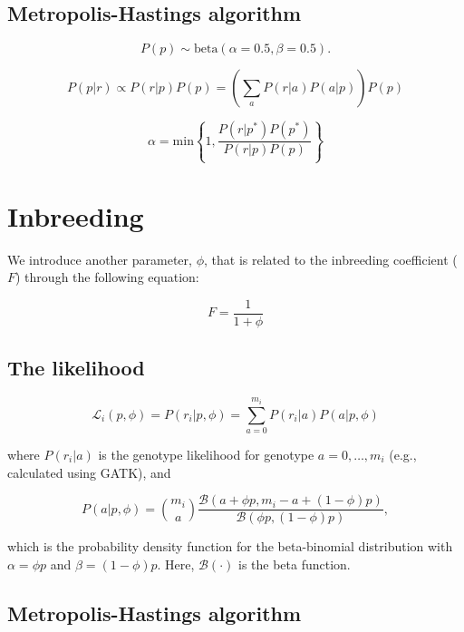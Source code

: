\documentclass[11pt,english,letterpaper,oneside]{article}
\begin{document}
\subsection{Metropolis-Hastings algorithm}

\begin{equation}
P(p) \sim \text{beta}(\alpha = 0.5, \beta = 0.5).
\end{equation}

\begin{equation}
P(p|r) \propto P(r|p)P(p) = \left(\sum_a P(r|a)P(a|p)\right)P(p)
\end{equation}

\begin{equation}
\alpha = \text{min} \left\{1, \frac{P(r|p^*)P(p^*)}{P(r|p)P(p)} \right\}
\end{equation}

\section{Inbreeding}

We introduce another parameter, $\phi$, that is related to the inbreeding coefficient ($F$) through the following equation:

\begin{equation}
F = \frac{1}{1 + \phi}
\end{equation}

\subsection{The likelihood}

\begin{equation}
\mathcal{L}_i(p,\phi) = P(r_i|p,\phi) = \sum_{a=0}^{m_i} P(r_i|a)P(a|p,\phi)
\end{equation}

where $P(r_i|a)$ is the genotype likelihood for genotype $a = 0,\dots,m_i$ (e.g., calculated using GATK), and

\begin{equation*}
P(a | p,\phi) = \binom{m_i}{a} \frac{\mathcal{B}(a + \phi{}p, m_i - a + (1 - \phi)p)}{\mathcal{B}(\phi{}p, (1-\phi)p)},
\end{equation*}

which is the probability density function for the beta-binomial distribution with $\alpha = \phi{}p$ and $\beta = (1 - \phi)p$. Here, $\mathcal{B}(\cdot)$ is the beta function.

\subsection{Metropolis-Hastings algorithm}
\end{document}
